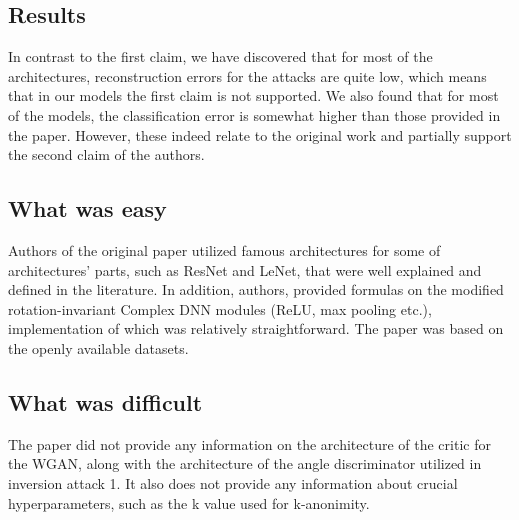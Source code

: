 \subsection*{Results}
In contrast to the first claim, we have discovered that for most of the architectures, reconstruction errors for the attacks are quite low, which means that in our models the first claim is not supported. We also found that for most of the models, the classification error is somewhat higher than those provided in the paper. However, these indeed relate to the original work and partially support the second claim of the authors.

\subsection*{What was easy}
Authors of the original paper utilized famous architectures for some of architectures' parts, such as ResNet and LeNet, that were well explained and defined in the literature. In addition, authors, provided formulas on the modified rotation-invariant Complex DNN modules (ReLU, max pooling etc.), implementation of which was relatively straightforward. The paper was based on the openly available datasets. 

\subsection*{What was difficult}
The paper did not provide  any information on the architecture of the critic for the WGAN, along with the architecture of the angle discriminator utilized in inversion attack 1. It also does not  provide any information about crucial hyperparameters, such as the k value used for k-anonimity.


